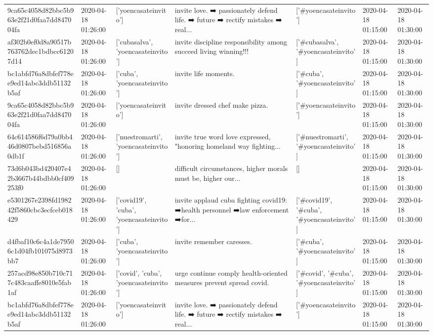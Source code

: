 \begin{tabular}{lllllll}
9ca65c4058d82bbc5b963e2f21d0faa7dd847004fa & 2020-04-18 01:26:00 & ['yoencasateinvito'] & invite love. ➡️ passionately defend life. ➡️ future ➡️ rectify mistakes ➡️ real... & ['#yoencasateinvito'] & 2020-04-18 01:15:00 & 2020-04-18 01:30:00 \\
af302b0ef0d8a90517b763762dec1bdbcc61207d14 & 2020-04-18 01:26:00 & ['cubasalva', 'yoencasateinvito'] & invite discipline responsibility among succeed living winning!!! & ['#cubasalva', '#yoencasateinvito'] & 2020-04-18 01:15:00 & 2020-04-18 01:30:00 \\
bc1abfd76a8dbfef778ee9ed14abc3ddb51132b5af & 2020-04-18 01:26:00 & ['cuba', 'yoencasateinvito'] & invite life moments. & ['#cuba', '#yoencasateinvito'] & 2020-04-18 01:15:00 & 2020-04-18 01:30:00 \\
9ca65c4058d82bbc5b963e2f21d0faa7dd847004fa & 2020-04-18 01:26:00 & ['yoencasateinvito'] & invite dressed chef make pizza. & ['#yoencasateinvito'] & 2020-04-18 01:15:00 & 2020-04-18 01:30:00 \\
64c614586f6d79a0bb446d0807bebd516856a0db1f & 2020-04-18 01:26:00 & ['nuestromarti', 'yoencasateinvito'] & invite true word love expressed, "honoring homeland way fighting... & ['#nuestromarti', '#yoencasateinvito'] & 2020-04-18 01:15:00 & 2020-04-18 01:30:00 \\
73d6b043bd420407e42b3667b44bdbb0cf409253f0 & 2020-04-18 01:26:00 & [] & difficult circumstances, higher morals must be, higher our... & [] & 2020-04-18 01:15:00 & 2020-04-18 01:30:00 \\
e5301267e2398fd198242f5860cbc3ecfceb018429 & 2020-04-18 01:26:00 & ['covid19', 'cuba', 'yoencasateinvito'] & invite applaud cuba fighting covid19: ➡️health personnel ➡️law enforcement ➡️for... & ['#covid19', '#cuba', '#yoencasateinvito'] & 2020-04-18 01:15:00 & 2020-04-18 01:30:00 \\
d4fbaf10c6c4a1de79506c1d04fb101075d8973bb7 & 2020-04-18 01:26:00 & ['cuba', 'yoencasateinvito'] & invite remember caresses. & ['#cuba', '#yoencasateinvito'] & 2020-04-18 01:15:00 & 2020-04-18 01:30:00 \\
257acd98e850b710c717c483caaffe8010e5fab1af & 2020-04-18 01:26:00 & ['covid', 'cuba', 'yoencasateinvito'] & urge continue comply health-oriented measures prevent spread covid. & ['#covid', '#cuba', '#yoencasateinvito'] & 2020-04-18 01:15:00 & 2020-04-18 01:30:00 \\
bc1abfd76a8dbfef778ee9ed14abc3ddb51132b5af & 2020-04-18 01:26:00 & ['yoencasateinvito'] & invite love. ➡️ passionately defend life. ➡️ future ➡️ rectify mistakes ➡️ real... & ['#yoencasateinvito'] & 2020-04-18 01:15:00 & 2020-04-18 01:30:00 \\

\end{tabular}
